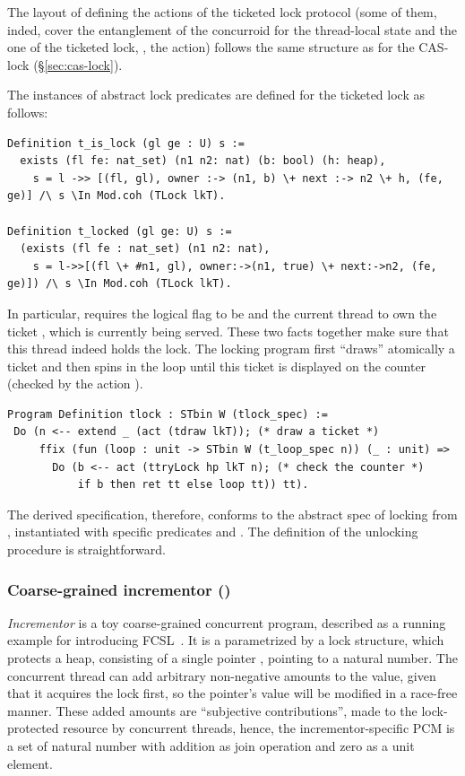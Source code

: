 The layout of defining the actions of the ticketed lock protocol (some
of them, inded, cover the entanglement of the concurroid for the
thread-local state and the one of the ticketed lock, \eg, the
 action) follows the same structure as for the
CAS-lock (\S \ref{sec:cas-lock}).

The instances of abstract lock predicates are defined for the ticketed
lock as follows:

\begin{lstlisting}
Definition t_is_lock (gl ge : U) s := 
  exists (fl fe: nat_set) (n1 n2: nat) (b: bool) (h: heap),
    s = l ->> [(fl, gl), owner :-> (n1, b) \+ next :-> n2 \+ h, (fe, ge)] /\ s \In Mod.coh (TLock lkT).

Definition t_locked (gl ge: U) s :=
  (exists (fl fe : nat_set) (n1 n2: nat),
    s = l->>[(fl \+ #n1, gl), owner:->(n1, true) \+ next:->n2, (fe, ge)]) /\ s \In Mod.coh (TLock lkT).  
\end{lstlisting}

In particular,  requires the logical flag  to be
 and the current thread to own the ticket , which
is currently being served. These two facts together make sure that
this thread indeed holds the lock.
%
The locking program first ``draws'' atomically a ticket and then spins
in the loop until this ticket is displayed on the counter (checked by
the action ).

\begin{lstlisting}
Program Definition tlock : STbin W (tlock_spec) :=
 Do (n <-- extend _ (act (tdraw lkT)); (* draw a ticket *)
     ffix (fun (loop : unit -> STbin W (t_loop_spec n)) (_ : unit) =>
       Do (b <-- act (ttryLock hp lkT n); (* check the counter *)
           if b then ret tt else loop tt)) tt).
\end{lstlisting}

The derived specification, therefore, conforms to the abstract spec of
locking from , instantiated with specific predicates
 and . The definition of the unlocking
procedure is straightforward.

\subsubsection{Coarse-grained incrementor ()}
\label{sec:incrementor}

\emph{Incrementor} is a toy coarse-grained concurrent program,
described as a running example for introducing FCSL~\cite[\S
3]{Nanevski-al:ESOP14}. It is a parametrized by a lock structure,
which protects a heap, consisting of a single pointer ,
pointing to a natural number. The concurrent thread can add arbitrary
non-negative amounts to the value, given that it acquires the lock
first, so the pointer's value will be modified in a race-free
manner. These added amounts are ``subjective contributions'', made to
the lock-protected resource by concurrent threads, hence, the
incrementor-specific PCM is a set of natural number with addition as
join operation and zero as a unit element.

